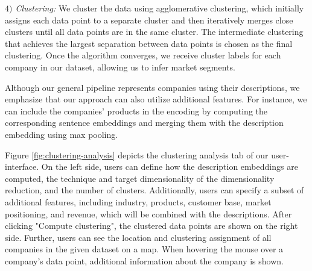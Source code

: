 \documentclass[12pt]{article}
\begin{document}
   \textit{$4)$ Clustering:} We cluster the data using agglomerative clustering, which initially assigns each data point to a separate cluster and then iteratively merges close clusters until all data points are in the same cluster. The intermediate clustering that achieves the largest separation between data points is chosen as the final clustering.
   Once the algorithm converges, we receive cluster labels for each company in our dataset, allowing us to infer market segments.
   
   Although our general pipeline represents companies using their descriptions, we emphasize that our approach can also utilize additional features. For instance, we can include the companies' products in the encoding by computing the corresponding sentence embeddings and merging them with the description embedding using max pooling.
   
   Figure \ref{fig:clustering-analysis} depicts the clustering analysis tab of our user-interface. On the left side, users can define how the description embeddings are computed, the technique and target dimensionality of the dimensionality reduction, and the number of clusters. Additionally, users can specify a subset of additional features, including industry, products, customer base, market positioning, and revenue, which will be combined with the descriptions. After clicking "Compute clustering", the clustered data points are shown on the right side. Further, users can see the location and clustering assignment of all companies in the given dataset on a map. When hovering the mouse over a company's data point, additional information about the company is shown.
   
\end{document}
